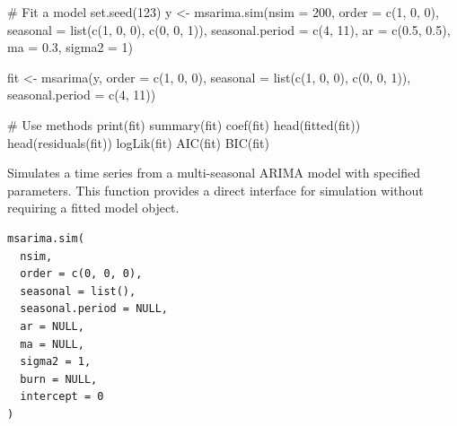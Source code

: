 \documentclass[a4paper]{book}
\begin{document}
%
\begin{SeeAlso}
\end{SeeAlso}
%
\begin{Examples}
\begin{ExampleCode}
# Fit a model
set.seed(123)
y <- msarima.sim(nsim = 200,
                 order = c(1, 0, 0),
                 seasonal = list(c(1, 0, 0), c(0, 0, 1)),
                 seasonal.period = c(4, 11),
                 ar = c(0.5, 0.5), ma = 0.3, sigma2 = 1)

fit <- msarima(y, order = c(1, 0, 0),
               seasonal = list(c(1, 0, 0), c(0, 0, 1)),
               seasonal.period = c(4, 11))

# Use methods
print(fit)
summary(fit)
coef(fit)
head(fitted(fit))
head(residuals(fit))
logLik(fit)
AIC(fit)
BIC(fit)

\end{ExampleCode}
\end{Examples}
%
\begin{Description}
Simulates a time series from a multi-seasonal ARIMA model with specified parameters.
This function provides a direct interface for simulation without requiring a fitted model object.
\end{Description}
%
\begin{Usage}
\begin{verbatim}
msarima.sim(
  nsim,
  order = c(0, 0, 0),
  seasonal = list(),
  seasonal.period = NULL,
  ar = NULL,
  ma = NULL,
  sigma2 = 1,
  burn = NULL,
  intercept = 0
)
\end{verbatim}
\end{Usage}
%
\end{document}
